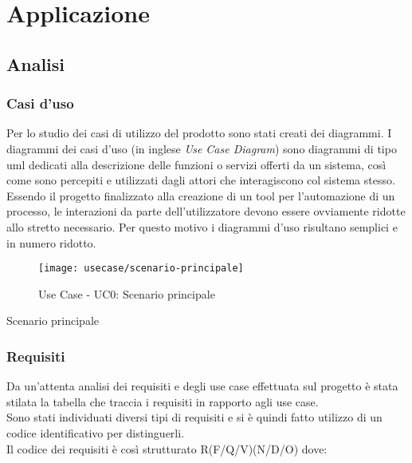 
\chapter{Applicazione}
\label{cap:applicazione}

\section{Analisi}
\subsection{Casi d'uso}

Per lo studio dei casi di utilizzo del prodotto sono stati creati dei diagrammi.
I diagrammi dei casi d'uso (in inglese \emph{Use Case Diagram}) sono diagrammi di tipo \gls{uml} dedicati alla descrizione delle funzioni o servizi offerti da un sistema, così come sono percepiti e utilizzati dagli attori che interagiscono col sistema stesso.
Essendo il progetto finalizzato alla creazione di un tool per l'automazione di un processo, le interazioni da parte dell'utilizzatore devono essere ovviamente ridotte allo stretto necessario. Per questo motivo i diagrammi d'uso risultano semplici e in numero ridotto.

\begin{figure}[!h] 
	\centering 
	\texttt{[image: usecase/scenario-principale]} 
	\caption{Use Case - UC0: Scenario principale}
\end{figure}

\begin{usecase}{0}{Scenario principale}
	\label{uc:scenario-principale}
\end{usecase}

\subsection{Requisiti}

Da un'attenta analisi dei requisiti e degli use case effettuata sul progetto è stata stilata la tabella che traccia i requisiti in rapporto agli use case.\\
Sono stati individuati diversi tipi di requisiti e si è quindi fatto utilizzo di un codice identificativo per distinguerli.\\
Il codice dei requisiti è così strutturato R(F/Q/V)(N/D/O) dove:

